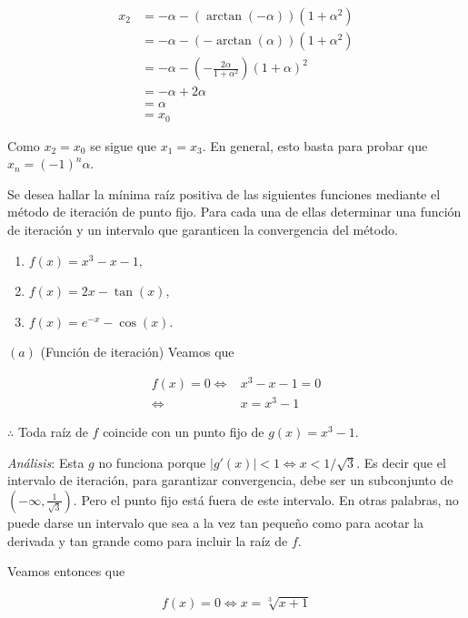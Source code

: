 \documentclass[12pt]{article}
\begin{document}
\begin{align*}
    x_2 
    &= -\alpha - \left( \arctan(-\alpha) \right) \left( 1 + \alpha^2 \right) \\ 
    &= -\alpha - \left( - \arctan(\alpha) \right) \left( 1 + \alpha^2 \right)
    \\ 
    &=-\alpha - \left( - \frac{2\alpha}{1 + \alpha^2} \right) (1 + \alpha)^2 \\ 
    &= -\alpha + 2\alpha \\ 
    &= \alpha \\ 
    &= x_0
\end{align*}

Como $x_2 = x_0$ se sigue que $x_1 = x_3$. En general, esto basta para probar
que $x_n = (-1)^n \alpha$.

\pagebreak 

\begin{myframe}
   Se desea hallar la mínima raíz positiva de las siguientes funciones mediante el método de iteración de punto fijo. Para cada una de ellas determinar una función de iteración y un intervalo que garanticen la convergencia del método.\begin{enumerate}\item[a)] $f(x) = x^3 - x - 1,$\item[b)] $f(x) = 2x - \tan(x),$\item[c)] $f(x) = e^{-x} - \cos(x).$\end{enumerate} 
\end{myframe}

$(a)$ (Función de iteración) Veamos que 

\begin{align*}
    f(x) = 0 \iff 
    &x^3 - x - 1 = 0 \\ 
    \iff 
    & x = x^3 - 1
\end{align*}

$\therefore $ Toda raíz de $f$ coincide con un punto fijo de $g(x) = x^3 - 1$.

\textit{Análisis}: Esta $g$ no funciona porque $\left| g'(x) \right| < 1 \iff x
< 1 / \sqrt{3} $. Es decir que el intervalo de iteración, para garantizar
convergencia, debe ser un subconjunto de $(-\infty, \frac{1}{\sqrt{3} })$. Pero
el punto fijo está fuera de este intervalo. En otras palabras, no puede darse un
intervalo que sea a la vez tan pequeño como para acotar la derivada y tan grande
como para incluir la raíz de $f$.

Veamos entonces que 

\begin{align*}
    f(x) = 0 \iff x = \sqrt[3]{x+1} 
\end{align*}
\end{document}
